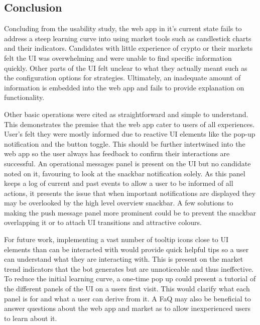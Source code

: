 \subsection{Conclusion}
\label{sec:evaluation:ui:conclusion}
\noindent Concluding from the usability study, the web app in it's current state fails to address a steep learning curve into using market tools such as candlestick charts and their indicators. Candidates with little experience of crypto or their markets felt the UI was overwhelming and were unable to find specific information quickly. Other parts of the UI felt unclear to what they actually meant such as the configuration options for strategies. Ultimately, an inadequate amount of information is embedded into the web app and fails to provide explanation on functionality.   

Other basic operations were cited as straightforward and simple to understand. This demonstrates the premise that the web app cater to users of all experiences. User's felt they were mostly informed due to reactive UI elements like the pop-up notification and the button toggle. This should be further intertwined into the web app so the user always has feedback to confirm their interactions are successful. An operational messages panel is present on the UI but no candidate noted on it, favouring to look at the snackbar notification solely. As this panel keeps a log of current and past events to allow a user to be informed of all actions, it presents the issue that when important notifications are displayed they may be overlooked by the high level overview snackbar. A few solutions to making the push message panel more prominent could be to prevent the snackbar overlapping it or to attach UI transitions and attractive colours.   

For future work, implementing a vast number of tooltip icons close to UI elements than can be interacted with would provide quick helpful tips so a user can understand what they are interacting with. This is present on the market trend indicators that the bot generates but are unnoticeable and thus ineffective. To reduce the initial learning curve, a one-time pop up could present a tutorial of the different panels of the UI on a users first visit. This would clarify what each panel is for and what a user can derive from it. A FaQ may also be beneficial to answer questions about the web app and market as to allow inexperienced users to learn about it.














